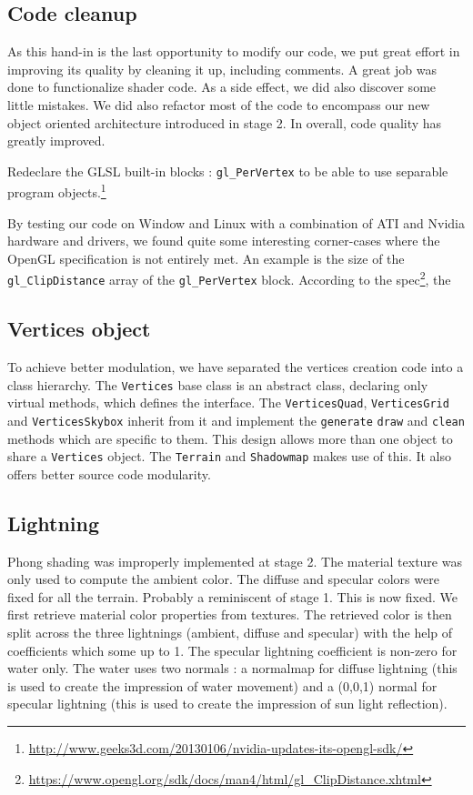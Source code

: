 \documentclass[a4paper,11pt]{article}
\begin{document}
\subsection{Code cleanup}

As this hand-in is the last opportunity to modify our code, we put great effort in improving its quality by cleaning it up, including comments. A great job was done to functionalize shader code. As a side effect, we did also discover some little mistakes. We did also refactor most of the code to encompass our new object oriented architecture introduced in stage 2. In overall, code quality has greatly improved.

Redeclare the GLSL built-in blocks : \texttt{gl\_PerVertex} to be able to use separable program objects.\footnote{\url{http://www.geeks3d.com/20130106/nvidia-updates-its-opengl-sdk/}}

By testing our code on Window and Linux with a combination of ATI and Nvidia hardware and drivers, we found quite some interesting corner-cases where the OpenGL specification is not entirely met. An example is the size of the \texttt{gl\_ClipDistance} array of the \texttt{gl\_PerVertex} block. According to the spec\footnote{\url{https://www.opengl.org/sdk/docs/man4/html/gl\_ClipDistance.xhtml}}, the

\subsection{Vertices object}

To achieve better modulation, we have separated the vertices creation code into a class hierarchy. The \texttt{Vertices} base class is an abstract class, declaring only virtual methods, which defines the interface. The \texttt{VerticesQuad}, \texttt{VerticesGrid} and \texttt{VerticesSkybox} inherit from it and implement the \texttt{generate} \texttt{draw} and \texttt{clean} methods which are specific to them. This design allows more than one  object to share a \texttt{Vertices} object. The \texttt{Terrain} and \texttt{Shadowmap} makes use of this. It also offers better source code modularity.

\subsection{Lightning}

Phong shading was improperly implemented at stage 2. The material texture was only used to compute the ambient color. The diffuse and specular colors were fixed for all the terrain. Probably a reminiscent of stage 1. This is now fixed. We first retrieve material color properties from textures. The retrieved color is then split across the three lightnings (ambient, diffuse and specular) with the help of coefficients which some up to 1. The specular lightning coefficient is non-zero for water only. The water uses two normals : a normalmap for diffuse lightning (this is used to create the impression of water movement) and a (0,0,1) normal for specular lightning (this is used to create the impression of sun light reflection).
\end{document}
